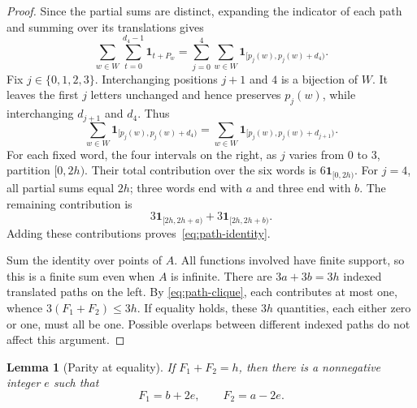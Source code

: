 \documentclass[11pt]{article}
\newtheorem{lemma}[theorem]{Lemma}
\theoremstyle{remark}
\newcommand{\ind}{\mathbf 1}
\begin{document}
\begin{proof}
Since the partial sums are distinct, expanding the indicator of each
path and summing over its translations gives
\[
 \sum_{w\in W}\sum_{t=0}^{d_4-1}\ind_{t+P_w}
 =\sum_{j=0}^4\sum_{w\in W}\ind_{[p_j(w),p_j(w)+d_4)}.
\]
Fix \(j\in\{0,1,2,3\}\). Interchanging positions \(j+1\) and
\(4\) is a bijection of \(W\). It leaves the first \(j\) letters
unchanged and hence preserves \(p_j(w)\), while interchanging
\(d_{j+1}\) and \(d_4\). Thus
\[
 \sum_{w\in W}\ind_{[p_j(w),p_j(w)+d_4)}
 =\sum_{w\in W}\ind_{[p_j(w),p_j(w)+d_{j+1})}.
\]
For each fixed word, the four intervals on the right, as \(j\) varies
from \(0\) to \(3\), partition \([0,2h)\). Their total contribution
over the six words is \(6\ind_{[0,2h)}\). For \(j=4\), all partial
sums equal \(2h\); three words end with \(a\) and three end with
\(b\). The remaining contribution is
\[
 3\ind_{[2h,2h+a)}+3\ind_{[2h,2h+b)}.
\]
Adding these contributions proves~\eqref{eq:path-identity}.

Sum the identity over points of \(A\). All functions involved have
finite support, so this is a finite sum even when \(A\) is infinite.
There are \(3a+3b=3h\) indexed translated paths on the left. By
\eqref{eq:path-clique}, each contributes at most one, whence
\(3(F_1+F_2)\le3h\). If equality holds, these \(3h\) quantities,
each either zero or one, must all be one. Possible overlaps between
different indexed paths do not affect this argument.
\end{proof}

\begin{lemma}[Parity at equality]\label{lem:parity}
If \(F_1+F_2=h\), then there is a nonnegative integer \(e\) such that
\begin{equation}\label{eq:parity}
 F_1=b+2e,\qquad F_2=a-2e.
\end{equation}
\end{lemma}
\end{document}
